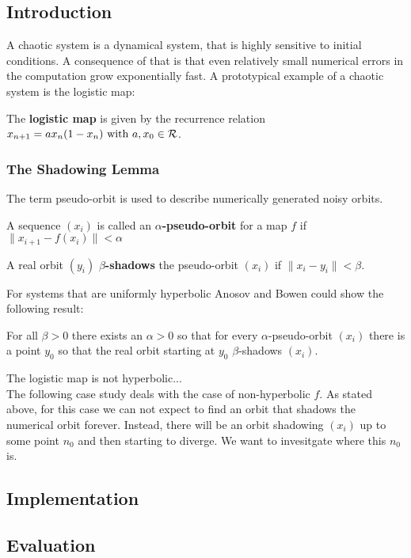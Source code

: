   \subsection{Introduction}
 
  A chaotic system is a dynamical system, that is highly sensitive to initial conditions.
  A consequence of that is that even relatively small numerical errors in the computation grow exponentially fast.
  A prototypical example of a chaotic system is the logistic map:
  \begin{definition}\label{def:logmap}
  The \textbf{logistic map} is given by the recurrence relation 
  $ x_{n+1} = ax_n(1-x_n) \text{ with } a, x_0 \in \mathcal R$.
  \end{definition} 

 \subsubsection{The Shadowing Lemma}
 The term pseudo-orbit is used to describe numerically generated noisy orbits. 
 \begin{definition}\label{def:pseudoorbit}
 A sequence $(x_i)$ is called an \textbf{$\alpha$-pseudo-orbit} for a map $f$ if
 $ \| x_{i+1} - f(x_i) \| < \alpha $  
 \end{definition}

  \begin{definition}\label{def:shadowing}
	A real orbit $(y_i)$ \textbf{$\beta$-shadows} the pseudo-orbit $(x_i)$ if 
	$\| x_i - y_i \| < \beta$.  
 \end{definition}
  For systems that are uniformly hyperbolic Anosov and Bowen could show the following result:
  \begin{lemma}
  For all $\beta > 0$ there exists an $\alpha > 0$ so that for every $\alpha$-pseudo-orbit $(x_i)$ there is a point $y_0$ so that the real orbit starting at $y_0$ $\beta$-shadows $(x_i)$.
  \end{lemma} 
  The logistic map is not hyperbolic...\\
  The following case study deals with the case of non-hyperbolic $f$. 
  As stated above, for this case we can not expect to find an orbit that shadows the numerical orbit forever. 
  Instead, there will be an orbit shadowing $(x_i)$ up to some point $n_0$ and then starting to diverge. 
  We want to invesitgate where this $n_0$ is.
  
   \cite{Hammel1987}
  \subsection{Implementation}
  \subsection{Evaluation}